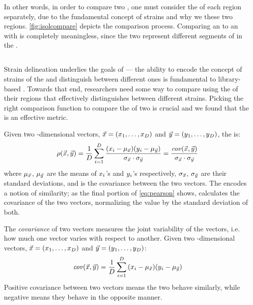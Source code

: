 \noindent 
In other words, in order to compare two \isols{}, one must consider the \pyros{} of each \itsshort{} region separately, due to the fundamental concept of strains and why we \pyro{} these two regions.
\autoref{fig:isolcompare} depicts the comparison process.
Comparing an \Ssixt{} \pyro{} to an \Sfive{} \pyro{} with \pcfunclabel{} is completely meaningless, since the two \pyros{} represent different segments of \dna{} in the \ecoli{}.

\subsection{\Pearson{}}
Strain delineation underlies the goals of \cplop{} --- the ability to encode the concept of strains of the \fib{} \ecoli{} and distinguish between different ones is fundamental to library-based \mst{}.
Towards that end, \cplop{} researchers need some way to compare \isols{} using the \pyros{} of their \itsshort{} regions that effectively distinguishes between different strains.
Picking the right comparison function to compare the \pyros{} of two \isols{} is crucial and we found that the \Pearson{} is an effective metric.

Given two \numdims{}-dimensional vectors, $\vec{x}{}=(x{}_1,\dots,x{}_{D})$ and $\vec{y}{}=(y{}_1,\dots,y{}_{D})$, the \pearson{}
\pcfunclabel{} is:
\begin{equation}\label{eq:pearson}
    \rho{}(\vec{x{}}, \vec{y{}})
    =
     \frac{1}{D{}}\sum_{i=1}^{D}{}\frac{(x{}_i - \mu_{\vec{x{}}})(y{}_i - \mu_{\vec{y{}}})}{\sigma_{\vec{x{}}}\cdot \sigma_{\vec{y{}}}} 
    =
    \frac{\mathit{cov}(\vec{x{}}, \vec{y{}})}{\sigma_{\vec{x{}}}\cdot\sigma_{\vec{y}}}
\end{equation}
where $\mu_{\vec{x}{}}$, $\mu_{\vec{y}{}}$ are the means of $x{}_i$'s and $y{}_i$'s respectively,
$\sigma_{\vec{x{}}}$, $\sigma_{\vec{y{}}}$ are their standard deviations,
and \veccov{\pca{}}{\pcb{}} is the covariance between the two vectors.
\index{\pearson{}}
\index{\pcfunclabel{}}
\index{\pcshort{}}
The \pearson{} encodes a notion of similarity;
as the final portion of \autoref{eq:pearson} shows, \pcshort{} calculates the covariance of the two vectors, normalizing the value by the standard deviation of both.

The \textit{covariance} of two vectors measures the joint variability of the vectors, i.e. how much one vector varies with respect to another.
Given two \numdims{}-dimensional vectors, $\vec{x}{}=(x{}_1,\dots,x{}_{D})$ and $\vec{y}{}=(y{}_1,\dots,y{}_{D})$:
\begin{equation}
    \mathit{cov}(\vec{x{}}, \vec{y{}}) =  \frac{1}{D{}}\sum_{i=1}^{D}{}(x{}_i - \mu_{\vec{x{}}})(y{}_i - \mu_{\vec{y{}}}) 
\end{equation}
Positive covariance between two vectors means the two behave similarly, while negative means they behave in the opposite manner. 

